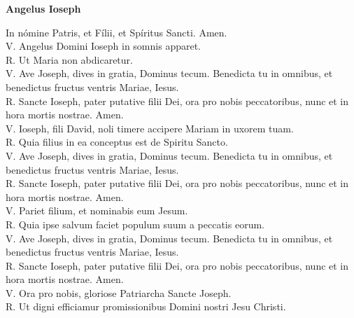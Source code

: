 \documentclass[letterpaper, landscape, 10pt, twocolumn]{article}
\begin{document}
\begin{center}
    {\fontsize{50pt}{60pt}\selectfont \textbf{Angelus Ioseph}}\\
  \end{center}
  \vspace{1cm}

  \noindent
  \Large {\color{red} I}n nómine Patris, et Fílii, et Spíritus Sancti. {\color{red} A}men.\\

  \noindent
  \normalsize
  {\color{red} V. A}ngelus Domini Ioseph in somnis apparet.\\
  {\color{red} R. U}t Maria non abdicaretur.\\

  \noindent
  {\color{red} V. A}ve Joseph, dives in gratia, Dominus tecum. Benedicta tu in omnibus, et benedictus fructus ventris Mariae, Iesus.\\
  {\color{red} R. S}ancte Ioseph, pater putative filii Dei, ora pro nobis peccatoribus, nunc et in hora mortis nostrae. {\color{red} A}men.\\

  \noindent
  {\color{red} V. I}oseph, fili David, noli timere accipere Mariam in uxorem tuam.\\
  {\color{red} R. Q}uia filius in ea conceptus est de Spiritu Sancto.\\

  \noindent
  {\color{red} V. A}ve Joseph, dives in gratia, Dominus tecum. Benedicta tu in omnibus, et benedictus fructus ventris Mariae, Iesus.\\
  {\color{red} R. S}ancte Ioseph, pater putative filii Dei, ora pro nobis peccatoribus, nunc et in hora mortis nostrae. {\color{red} A}men.\\

  \noindent
  {\color{red} V. P}ariet filium, et nominabis eum Jesum.\\
  {\color{red} R. Q}uia ipse salvum faciet populum suum a peccatis eorum.\\

  \noindent
  {\color{red} V. A}ve Joseph, dives in gratia, Dominus tecum. Benedicta tu in omnibus, et benedictus fructus ventris Mariae, Iesus.\\
  {\color{red} R. S}ancte Ioseph, pater putative filii Dei, ora pro nobis peccatoribus, nunc et in hora mortis nostrae. {\color{red} A}men.\\

  \noindent
  {\color{red} V. O}ra pro nobis, gloriose Patriarcha Sancte Joseph.\\
  {\color{red} R. U}t digni efficiamur promissionibus Domini nostri Jesu Christi.\\
\end{document}
